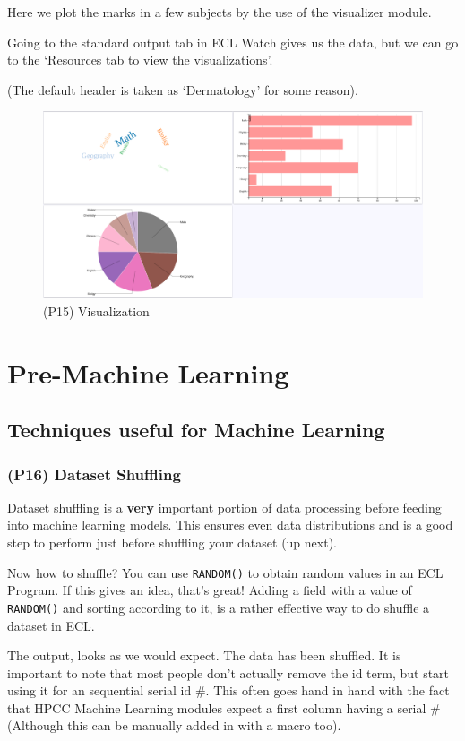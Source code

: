 \documentclass[a4paper,oneside,12pt]{book}
\begin{document}
Here we plot the marks in a few subjects by the use of the visualizer module.




Going to the standard output tab in ECL Watch gives us the data, but we can go to the `Resources tab to view the visualizations'.

(The default header is taken as `Dermatology' for some reason).

\begin{figure}[h]
    \centering
    \includegraphics[width=.6\linewidth]{../output/79/1}
    \caption{(P15) Visualization}
\end{figure}




\chapter{Pre-Machine Learning}
\section{Techniques useful for Machine Learning}
\subsection[Dataset Shuffling]{(P16) Dataset Shuffling}

Dataset shuffling is a \textbf{very} important portion of data processing before feeding into machine learning models. This ensures even data distributions and is a good step to perform just before shuffling your dataset (up next).

Now how to shuffle? You can use \lstinline{RANDOM()} to obtain random values in an ECL Program. If this gives an idea, that's great! Adding a field with a value of \lstinline{RANDOM()} and sorting according to it, is a rather effective way to do shuffle a dataset in ECL.



The output, looks as we would expect. The data has been shuffled. It is important to note that most people don't actually remove the id term, but start using it for an sequential serial id \#. This often goes hand in hand with the fact that HPCC Machine Learning modules expect a first column having a serial \# (Although this can be manually added in with a macro too).
\end{document}

